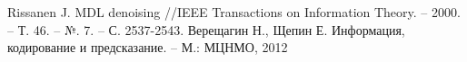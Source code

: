 \documentclass[12pt]{article}
\begin{document}
	
	\begin{thebibliography}{9}
	Rissanen J. MDL denoising //IEEE Transactions on Information Theory. – 2000. -- Т. 46. -- №. 7. -- С. 2537-2543.
	Верещагин Н., Щепин Е. Информация, кодирование и предсказание. -- М.: МЦНМО, 2012 \end{thebibliography}
\end{document}
